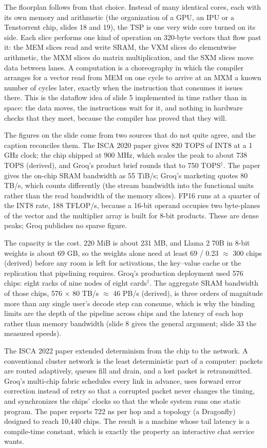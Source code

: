 \documentclass[11pt,letterpaper]{article}
\begin{document}
The floorplan follows from that choice. Instead of many identical cores, each with its own memory and arithmetic (the organization of a GPU, an IPU or a Tenstorrent chip, slides 18 and 19), the TSP is one very wide core turned on its side. Each slice performs one kind of operation on 320-byte vectors that flow past it: the MEM slices read and write SRAM, the VXM slices do elementwise arithmetic, the MXM slices do matrix multiplication, and the SXM slices move data between lanes. A computation is a choreography in which the compiler arranges for a vector read from MEM on one cycle to arrive at an MXM a known number of cycles later, exactly when the instruction that consumes it issues there. This is the dataflow idea of slide 5 implemented in time rather than in space: the data moves, the instructions wait for it, and nothing in hardware checks that they meet, because the compiler has proved that they will.

The figures on the slide come from two sources that do not quite agree, and the caption reconciles them. The ISCA 2020 paper gives 820 TOPS of INT8 at a 1 GHz clock; the chip shipped at 900 MHz, which scales the peak to about 738 TOPS (derived), and Groq's product brief rounds that to 750 TOPS$^\dagger$. The paper gives the on-chip SRAM bandwidth as 55 TiB/s; Groq's marketing quotes 80 TB/s, which counts differently (the stream bandwidth into the functional units rather than the read bandwidth of the memory slices). FP16 runs at a quarter of the INT8 rate, 188 TFLOP/s, because a 16-bit operand occupies two byte-planes of the vector and the multiplier array is built for 8-bit products. These are dense peaks; Groq publishes no sparse figure.

The capacity is the cost. 220 MiB is about 231 MB, and Llama 2 70B in 8-bit weights is about 69 GB, so the weights alone need at least 69 / 0.23 $\approx$ 300 chips (derived) before any room is left for activations, the key--value cache or the replication that pipelining requires. Groq's production deployment used 576 chips: eight racks of nine nodes of eight cards$^\dagger$. The aggregate SRAM bandwidth of those chips, 576 $\times$ 80 TB/s $\approx$ 46 PB/s (derived), is three orders of magnitude more than any single user's decode step can consume, which is why the binding limits are the depth of the pipeline across chips and the latency of each hop rather than memory bandwidth (slide 8 gives the general argument; slide 33 the measured speeds).

The ISCA 2022 paper extended determinism from the chip to the network. A conventional cluster network is the least deterministic part of a computer: packets are routed adaptively, queues fill and drain, and a lost packet is retransmitted. Groq's multi-chip fabric schedules every link in advance, uses forward error correction instead of retry so that a corrupted packet never changes the timing, and synchronizes the chips' clocks so that the whole system runs one static program. The paper reports 722 ns per hop and a topology (a Dragonfly) designed to reach 10{,}440 chips. The result is a machine whose tail latency is a compile-time constant, which is exactly the property an interactive chat service wants.
\end{document}
